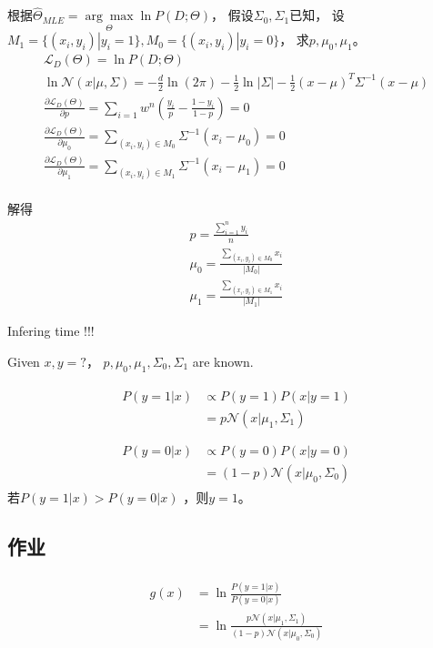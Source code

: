 \documentclass[UTF8]{ctexart}
\begin{document}
根据$\hat \Theta_{MLE}=\underset{\Theta}{\arg \max}\ln{P(D;\Theta)}$， 假设$\Sigma_0, \Sigma_1$已知，
设$M_1=\{(x_i, y_i)| y_i=1\}, M_0=\{(x_i, y_i)| y_i=0\}$，
求$p, \mu_0, \mu_1$。
\begin{gather*}
    \mathcal{L}_D(\Theta) = \ln{P(D;\Theta)} \\
    \ln{\mathcal{N}(x|\mu,\Sigma)} = -\frac{d}{2}\ln{(2\pi)}-\frac{1}{2}\ln{|\Sigma|}-\frac{1}{2}(x-\mu)^T\Sigma^{-1}(x-\mu) \\
    \frac{\partial \mathcal{L}_D(\Theta)}{\partial p} = \sum_{i=1}w^n(\frac{y_i}{p}-\frac{1-y_i}{1-p}) =0 \\
    \frac{\partial \mathcal{L}_D(\Theta)}{\partial \mu_0} =  \sum_{(x_i,y_i)\in M_0} {\Sigma^{-1}(x_i-\mu_0)} =0 \\
    \frac{\partial \mathcal{L}_D(\Theta)}{\partial \mu_1} =  \sum_{(x_i,y_i)\in M_1} {\Sigma^{-1}(x_i-\mu_1)} =0 \\
\end{gather*}

解得
\begin{gather*}
    p = \frac{\sum_{i=1}^n y_i}{n} \\
    \mu_0 = \frac{\sum_{(x_i, y_i)\in M_0}x_i}{|M_0|} \\
    \mu_1 = \frac{\sum_{(x_i, y_i)\in M_1}x_i}{|M_1|} 
\end{gather*}

Infering time !!!

Given $x, y=?$， $p, \mu_0, \mu_1, \Sigma_0, \Sigma_1$ are known.

\begin{gather*}
    \begin{aligned}
        P(y=1|x) & \propto P(y=1)P(x|y=1) \\    
        &=p \mathcal{N}(x|\mu_1, \Sigma_1) \\
    \end{aligned}
    \\
    \begin{aligned}
        P(y=0|x) & \propto P(y=0)P(x|y=0) \\    
        &=(1-p) \mathcal{N}(x|\mu_0, \Sigma_0) 
    \end{aligned}
\end{gather*}
若$ P(y=1|x) >  P(y=0|x)$ ，则$y=1$。

\subsection{\textbf{作业} }
\begin{gather*}
    \begin{aligned}
        g(x) &=\ln{\frac{P(y=1|x)}{P(y=0|x)}} \\     
        &=\ln{\frac{p \mathcal{N}(x|\mu_1, \Sigma_1)}{(1-p) \mathcal{N}(x|\mu_0, \Sigma_0) }}
    \end{aligned}
\end{gather*}
\end{document}
